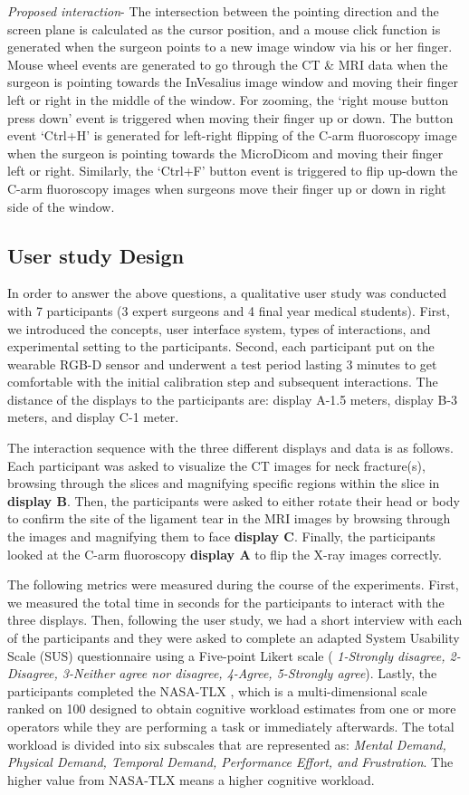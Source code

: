 {\textit{Proposed interaction}- The intersection between the pointing direction and the screen plane is calculated as the cursor position, and a mouse click function is generated when the surgeon points to a new image window via his or her finger. Mouse wheel events are generated to go through the CT \& MRI data when the surgeon is pointing towards the InVesalius image window and moving their finger left or right in the middle of the window. For zooming, the `right mouse button press down' event is triggered when moving their finger up or down. The button event `Ctrl+H' is generated for left-right flipping of the C-arm fluoroscopy image when the surgeon is pointing towards the MicroDicom and moving their finger left or right. Similarly, the `Ctrl+F' button event is triggered to flip up-down the C-arm fluoroscopy images when surgeons move their finger up or down in right side of the window.
\subsection{User study Design}
In order to answer the above questions, a qualitative user study was conducted with 7 participants (3 expert surgeons and 4 final year medical students). First, we introduced the concepts, user interface system, types of interactions, and experimental setting to the participants. Second, each participant put on the wearable RGB-D sensor and underwent a test period lasting 3 minutes to get comfortable with the initial calibration step and subsequent interactions. The distance of the displays to the participants are: display A-1.5 meters, display B-3 meters, and display C-1 meter.

The interaction sequence with the three different displays and data is as follows. Each participant was asked to visualize the CT images for neck fracture(s), browsing through the slices and magnifying specific regions within the slice in \textbf{display B}. Then, the participants were asked to either rotate their head or body to confirm the site of the ligament tear in the MRI images by browsing through the images and magnifying them to face \textbf{display C}. Finally, the participants looked at the C-arm fluoroscopy \textbf{display A} to flip the X-ray images correctly.

The following metrics were measured during the course of the experiments. First, we measured the total time in seconds for the participants to interact with the three displays. Then, following the user study, we had a short interview with each of the participants and they were asked to complete an adapted System Usability Scale (SUS) \cite{Brooke1996} questionnaire using a Five-point Likert scale (\textit{ 1-Strongly disagree, 2-Disagree, 3-Neither agree nor disagree, 4-Agree, 5-Strongly agree}). Lastly, the participants completed the NASA-TLX \cite{Hart2006}, which is a multi-dimensional scale ranked on 100 designed to obtain cognitive workload estimates from one or more operators while they are performing a task or immediately afterwards. The total workload is divided into six subscales that are represented as: \textit{Mental Demand, Physical Demand, Temporal Demand, Performance Effort, and Frustration}. The higher value from NASA-TLX means a higher cognitive workload.
}
